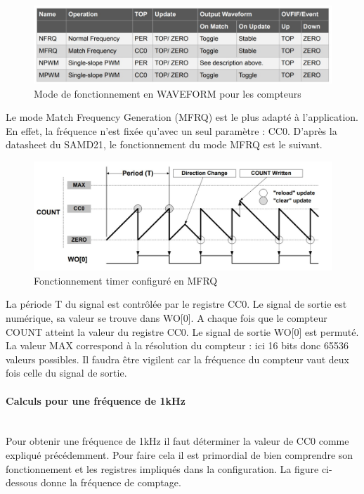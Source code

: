 \documentclass[a4paper]{article}
\begin{document}
	\begin{figure}[H]
		\centering
		\includegraphics[width=0.9\linewidth]{mode Waveform.jpg}
		\caption{Mode de fonctionnement en WAVEFORM pour les compteurs}
	\end{figure}
	
	Le mode Match Frequency Generation (MFRQ) est le plus adapté à l'application. En effet, la fréquence n'est fixée qu'avec un seul paramètre : CC0. D'après la datasheet du SAMD21, le fonctionnement du mode MFRQ est le suivant. \\
	
	\begin{figure}[H]
		\centering
		\includegraphics[width=0.85\linewidth]{Match Frequency Operation.jpg}
		\caption{Fonctionnement timer configuré en MFRQ}
	\end{figure}
	La période T du signal est contrôlée par le registre CC0. Le signal de sortie est numérique, sa valeur se trouve dans WO[0]. A chaque fois que le compteur COUNT atteint la valeur du registre CC0.  Le signal de sortie WO[0] est permuté. La valeur MAX correspond à la résolution du compteur : ici 16 bits donc 65536 valeurs possibles. Il faudra être vigilent car la fréquence du compteur vaut deux fois celle du signal de sortie.\\
	
	\paragraph{Calculs pour une fréquence de 1kHz}
	~~\\
	Pour obtenir une fréquence de 1kHz il faut déterminer la valeur de CC0 comme expliqué précédemment. Pour faire cela il est primordial de bien comprendre son fonctionnement et les registres impliqués dans la configuration. La figure ci-dessous donne la fréquence de comptage. \\
	
\end{document}

